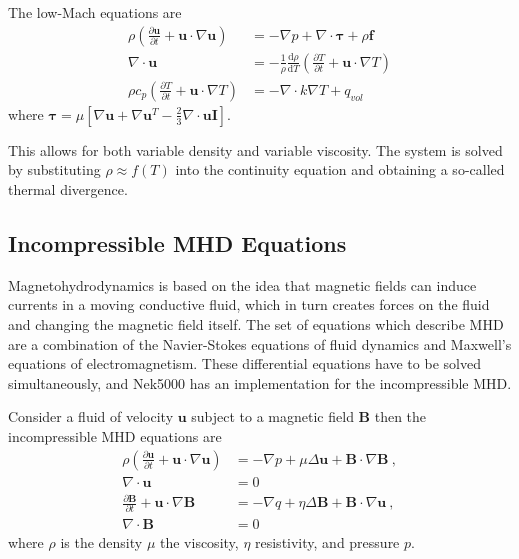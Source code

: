 \documentclass[letterpaper,10pt,english]{sphinxmanual}
\begin{document}
The low-Mach equations are
\begin{equation}\label{equation:theory:lowmach}
\begin{split}\rho\left(\frac{\partial \mathbf u}{\partial t}+ \mathbf u\cdot\nabla\mathbf u\right)&=-\nabla p+\nabla \cdot\boldsymbol\tau+\rho\mathbf f\ \\
\nabla \cdot \mathbf u &= -\frac{1}{\rho}\frac{\mathrm d \rho}{\mathrm d T}\left(\frac{\partial T}{\partial t}+ \mathbf u\cdot\nabla T\right) \\
\rho c_p\left(\frac{\partial T}{\partial t}+ \mathbf u\cdot\nabla T\right)&=-\nabla \cdot k \nabla T + q_{vol}\end{split}
\end{equation}
where \(\boldsymbol\tau=\mu[\nabla \mathbf u+\nabla \mathbf u^{T}-\frac{2}{3}\nabla \cdot
\mathbf u \mathbf I]\).

This allows for both variable density and variable viscosity.
The system is solved by substituting \(\rho\approx f(T)\) into the continuity equation and obtaining a so-called thermal divergence.


\subsection{Incompressible MHD Equations}
\label{\detokenize{theory:intro-mhd}}\label{\detokenize{theory:incompressible-mhd-equations}}
Magnetohydrodynamics is based on the idea that magnetic fields can induce currents in a moving
conductive fluid, which in turn creates forces on the fluid and changing the magnetic field itself.
The set of equations which describe MHD are a combination of the Navier-Stokes equations of fluid
dynamics and Maxwell’s equations of electromagnetism. These differential equations have to be
solved simultaneously, and Nek5000 has an implementation for the incompressible MHD.

Consider a fluid of velocity \(\mathbf u\) subject to a magnetic field \(\mathbf B\) then
the incompressible MHD equations are
\begin{equation}\label{equation:theory:mhd}
\begin{split}\rho\left(\frac{\partial\mathbf u}{\partial t} + \mathbf u \cdot \nabla \mathbf u\right) &= - \nabla p + \mu \Delta \mathbf u + \mathbf B\cdot \nabla \mathbf B \ ,\\
\nabla \cdot \mathbf u &= 0\\ \nonumber
\frac{\partial \mathbf B}{\partial t} + \mathbf u \cdot \nabla \mathbf B &= - \nabla q + \eta \Delta \mathbf B + \mathbf B\cdot \nabla \mathbf u \ ,\\
\nabla \cdot \mathbf B &= 0\end{split}
\end{equation}
where \(\rho\) is the density \(\mu\) the viscosity, \(\eta\) resistivity, and pressure \(p\).
\end{document}

